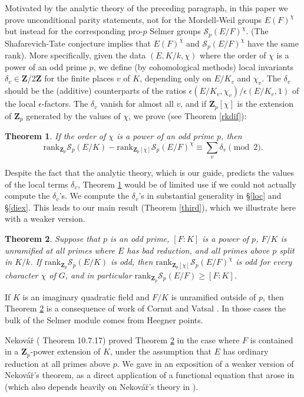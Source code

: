 \documentclass[reqno]{amsart}
\newtheorem{introthm}{Theorem}
\theoremstyle{definition}
\def\Z{\mathbf{Z}}
\def\Zp{\Z_p}
\def\cS{\mathcal{S}}
\def\rk{\mathrm{rank}}
\def\Scp{\cS_p}
\def\k{k}
\begin{document}
Motivated by the analytic theory of the preceding paragraph, 
in this paper we prove unconditional parity 
statements, not for the Mordell-Weil groups $E(F)^\chi$ but instead 
for the corresponding pro-$p$ Selmer groups $\Scp(E/F)^\chi$.  
(The Shafarevich-Tate conjecture implies that $E(F)^\chi$ and $\Scp(E/F)^\chi$ 
have the same rank).
More specifically, given the data $(E,K/\k,\chi)$ where the order of 
$\chi$ is a power of an odd prime $p$, 
we define (by cohomological methods) local invariants $\delta_v \in \Z/2\Z$ 
for the finite places $v$ of $K$, depending only on $E/K_v$ and 
$\chi_v$.  The $\delta_v$ should be the 
(additive) counterparts of the ratios 
$\epsilon(E/K_v,\chi_v)/\epsilon(E/K_v,1)$ of the local $\epsilon$-factors.  
The $\delta_v$ vanish for almost all $v$, and if 
$\Zp[\chi]$ is the extension of $\Zp$ generated by the values of $\chi$, 
we prove (see Theorem \ref{rkdif}):

\begin{introthm}
\label{thma}
If the order of $\chi$ is a power of an odd prime $p$, then 
$$
\rk_{\Zp}\Scp(E/K) - \rk_{\Zp[\chi]}\Scp(E/F)^\chi 
    \equiv \sum_v \delta_v \pmod{2}.
$$
\end{introthm}

Despite the fact that the analytic theory, which is our guide, 
predicts the values of the local terms $\delta_v$, Theorem \ref{thma} 
would be of limited use if we could not actually compute the 
$\delta_v$'s.  
We compute the $\delta_v$'s in substantial generality in \S\ref{loc} and \S\ref{diex}.  
This leads to our main result (Theorem \ref{third}), which we illustrate 
here with a weaker version.

\begin{introthm}
\label{thmb}
Suppose that $p$ is an odd prime, $[F:K]$ is a power of $p$,
$F/K$ is unramified at all primes where $E$ has bad reduction, and 
all primes above $p$ split in $K/\k$.  If $\rk_{\Zp}\Scp(E/K)$ is odd, 
then $\rk_{\Zp[\chi]}\Scp(E/F)^\chi$ is odd for every character $\chi$ of $G$, and 
in particular $\rk_{\Zp}\Scp(E/F) \ge [F:K]$.
\end{introthm}

If $K$ is an imaginary quadratic field and $F/K$ is unramified outside 
of $p$, then Theorem \ref{thmb} is a consequence of work of 
Cornut and Vatsal \cite{cornut, vatsal}.  In those cases 
the bulk of the Selmer module comes from Heegner points.  

Nekov\'a\u{r} (\cite{nekovar} Theorem 10.7.17) 
proved Theorem \ref{thmb} in the case where 
$F$ is contained in a $\Zp$-power extension of $K$, under the assumption 
that $E$ has ordinary reduction at all primes above $p$.  We gave in 
\cite{finding} an exposition of a weaker version of Nekov\'a\u{r}'s theorem, 
as a direct application of a functional equation that arose in 
\cite{organization} (which also depends heavily on Nekov\'a\u{r}'s theory 
in \cite{nekovar}). 
\end{document}
